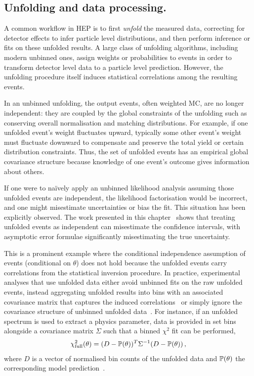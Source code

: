     \subsection{Unfolding and data processing.}
        A common workflow in HEP is to first \emph{unfold} the measured data, correcting for detector effects to infer particle level distributions, and then perform inference or fits on these unfolded results.
        A large class of unfolding algorithms, including modern unbinned ones, assign weights or probabilities to events in order to transform detector level data to a particle level prediction.
        However, the unfolding procedure itself induces statistical correlations among the resulting events.
        
        In an unbinned unfolding, the output events, often weighted MC, are no longer independent: they are coupled by the global constraints of the unfolding such as conserving overall normalisation and matching distributions.
        For example, if one unfolded event’s weight fluctuates upward, typically some other event’s weight must fluctuate downward to compensate and preserve the total yield or certain distribution constraints.
        Thus, the set of unfolded events has an empirical global covariance structure because knowledge of one event's outcome gives information about others.
        
        If one were to na\"ively apply an unbinned likelihood analysis assuming those unfolded events are independent, the likelihood factorisation would be incorrect, and one might misestimate uncertainties or bias the fit.
        This situation has been explicitly observed.
        The work presented in this chapter~\cite{Desai:2025mpy} shows that treating unfolded events as independent can misestimate the confidence intervals, with asymptotic error formulae significantly misestimating the true uncertainty.
        
        This is a prominent example where the conditional independence assumption of events (conditional on $\theta$) does not hold because the unfolded events carry correlations from the statistical inversion procedure.
        In practice, experimental analyses that use unfolded data either avoid unbinned fits on the raw unfolded events, instead aggregating unfolded results into bins with an associated covariance matrix that captures the induced correlations~\cite{Huang2025MachineTechnique} or simply ignore the covariance structure of unbinned unfolded data~\cite{Canelli:2025ybb, Arratia:2021otl}.
        For instance, if an unfolded spectrum is used to extract a physics parameter, data is provided in set bins alongside a covariance matrix $\Sigma$ such that a binned $\chi^2$ fit can be performed,
          \[
            \label{eq:chi2cov}
            \chi^2_{\text{full}}(\theta) = (D - \P(\theta))^T \Sigma^{-1} (D - \P(\theta))\,,
          \] 
        where $D$ is a vector of normalised bin counts of the unfolded data and $\P(\theta)$ the corresponding model prediction~\cite{D0:2020ujb, CMS:2024onh, Gribanov:2022gri, Canonero:2024kzk}.
        
